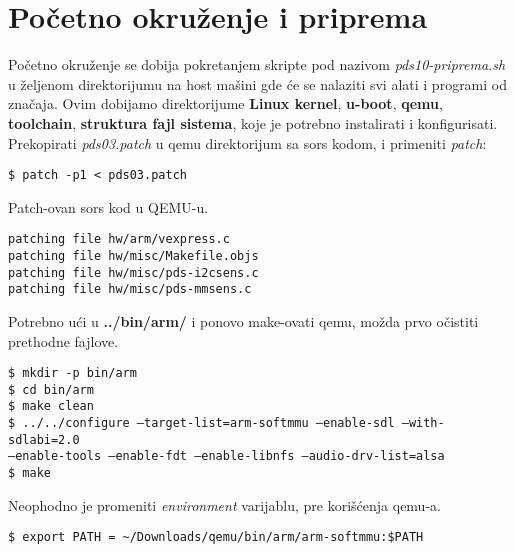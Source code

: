 \documentclass{article}
\begin{document}
\section{Početno okruženje i priprema}

Početno okruženje se dobija pokretanjem skripte pod nazivom \textit{pds10-priprema.sh} u željenom direktorijumu na host mašini gde će se nalaziti svi alati i programi od značaja. Ovim dobijamo direktorijume \textbf{Linux kernel}, \textbf{u-boot}, \textbf{qemu}, \textbf{toolchain}, \textbf{struktura fajl sistema}, koje je potrebno instalirati i konfigurisati. \\

Prekopirati \textit{pds03.patch} u qemu direktorijum sa sors kodom, i primeniti \textit{patch}:

\begin{commandline}
  \begin{verbatim}
$ patch -p1 < pds03.patch
  \end{verbatim}
\end{commandline}

Patch-ovan sors kod u QEMU-u.

\begin{commandline}
  \begin{verbatim}
patching file hw/arm/vexpress.c
patching file hw/misc/Makefile.objs
patching file hw/misc/pds-i2csens.c
patching file hw/misc/pds-mmsens.c
  \end{verbatim}
\end{commandline}

Potrebno ući u \textbf{../bin/arm/} i ponovo make-ovati qemu, možda prvo očistiti prethodne fajlove.

\begin{commandline}
  \begin{verbatim}
$ mkdir -p bin/arm
$ cd bin/arm
$ make clean
$ ../../configure –target-list=arm-softmmu –enable-sdl –with-sdlabi=2.0 
–enable-tools –enable-fdt –enable-libnfs –audio-drv-list=alsa
$ make
  \end{verbatim}
\end{commandline}


Neophodno je promeniti \textit{environment} varijablu, pre korišćenja qemu-a.

\begin{commandline}
  \begin{verbatim}
$ export PATH = ~/Downloads/qemu/bin/arm/arm-softmmu:$PATH
  \end{verbatim}
\end{commandline}
\end{document}
